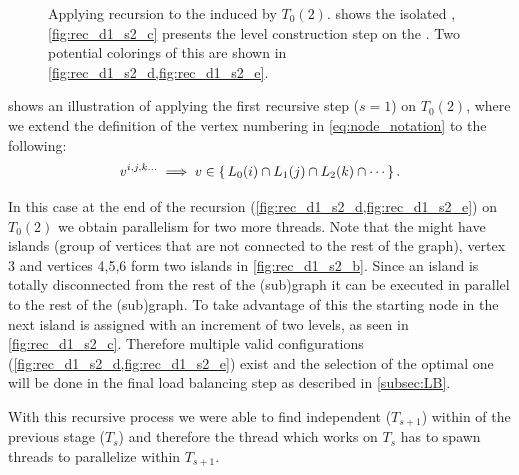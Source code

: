 \begin{figure}[thbp]
	     \hspace{1.75em}
     	\caption{Applying recursion to the \subgraph induced by $T_0(2)$.  shows the isolated \subgraph, \cref{fig:rec_d1_s2_c} presents the level construction step on the \subgraph. Two potential \DONE colorings of this  \subgraph are shown in \cref{fig:rec_d1_s2_d,fig:rec_d1_s2_e}.}
     	
     	\label{fig:rec_d1_s2}
     \end{figure}
     
      shows an illustration of applying the first recursive step ($s=1$) on $T_0(2)$, where we extend the definition of the vertex numbering in \cref{eq:node_notation} to the following:
	 \begin{equation}
	    v^{i,j,k...} \implies v \in \set{L_0(i) \cap L_1(j) \cap L_2(k) \cap \cdots}.
	 \end{equation}
	 
     In this case at the end of the recursion (\cf \cref{fig:rec_d1_s2_d,fig:rec_d1_s2_e}) on $T_0(2)$ we obtain parallelism for two more threads. Note that the \subgraphs might have islands (group of vertices that are not connected to the rest of the graph), \eg vertex 3 and vertices 4,5,6 form two islands in \cref{fig:rec_d1_s2_b}. Since an island is totally disconnected from the rest of the (sub)graph it can be executed in parallel to the rest of the (sub)graph. To take advantage of this the starting node in the next island is assigned with an increment of two levels, as seen in \cref{fig:rec_d1_s2_c}. Therefore multiple valid \DONE configurations (\cf \cref{fig:rec_d1_s2_d,fig:rec_d1_s2_e}) exist and the selection of the optimal one will be done in the final load balancing step as described in \cref{subsec:LB}.    
     
     With this recursive process we were able to find independent \levelGroups ($T_{s+1}$) within \levelGroup of the previous stage ($T_s$) and therefore the thread which works on $T_s$ has to spawn threads to parallelize within $T_{s+1}$.
     
